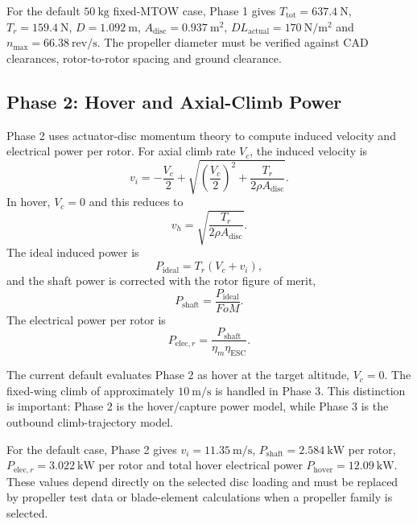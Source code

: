 For the default \(50~\mathrm{kg}\) fixed-MTOW case, Phase 1 gives \(T_{\mathrm{tot}}=637.4~\mathrm{N}\), \(T_r=159.4~\mathrm{N}\), \(D=1.092~\mathrm{m}\), \(A_{\mathrm{disc}}=0.937~\mathrm{m^2}\), \(DL_{\mathrm{actual}}=170~\mathrm{N/m^2}\) and \(n_{\max}=66.38~\mathrm{rev/s}\). The propeller diameter must be verified against CAD clearances, rotor-to-rotor spacing and ground clearance.

\subsection{Phase 2: Hover and Axial-Climb Power}
\label{subsec:ppa_phase2}

Phase 2 uses actuator-disc momentum theory to compute induced velocity and electrical power per rotor. For axial climb rate \(V_c\), the induced velocity is \cite{Leishman2006}
\begin{equation}
    v_i = -\frac{V_c}{2}
          + \sqrt{\left(\frac{V_c}{2}\right)^2+\frac{T_r}{2\rho A_{\mathrm{disc}}}} .
    \label{eq:ppa_induced_velocity_climb}
\end{equation}
In hover, \(V_c=0\) and this reduces to
\begin{equation}
    v_h = \sqrt{\frac{T_r}{2\rho A_{\mathrm{disc}}}} .
    \label{eq:ppa_hover_induced_velocity}
\end{equation}
The ideal induced power is
\begin{equation}
    P_{\mathrm{ideal}} = T_r(V_c+v_i),
    \label{eq:ppa_ideal_power}
\end{equation}
and the shaft power is corrected with the rotor figure of merit,
\begin{equation}
    P_{\mathrm{shaft}} = \frac{P_{\mathrm{ideal}}}{FoM}.
    \label{eq:ppa_shaft_power}
\end{equation}
The electrical power per rotor is
\begin{equation}
    P_{\mathrm{elec},r} =
    \frac{P_{\mathrm{shaft}}}{\eta_m\eta_{\mathrm{ESC}}}.
    \label{eq:ppa_electric_power_rotor}
\end{equation}

The current default evaluates Phase 2 as hover at the target altitude, \(V_c=0\). The fixed-wing climb of approximately \(10~\mathrm{m/s}\) is handled in Phase 3. This distinction is important: Phase 2 is the hover/capture power model, while Phase 3 is the outbound climb-trajectory model.

For the default case, Phase 2 gives \(v_i=11.35~\mathrm{m/s}\), \(P_{\mathrm{shaft}}=2.584~\mathrm{kW}\) per rotor, \(P_{\mathrm{elec},r}=3.022~\mathrm{kW}\) per rotor and total hover electrical power \(P_{\mathrm{hover}}=12.09~\mathrm{kW}\). These values depend directly on the selected disc loading and must be replaced by propeller test data or blade-element calculations when a propeller family is selected.

